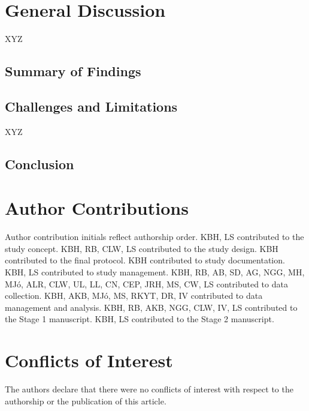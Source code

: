 \documentclass[,man,floatsintext]{apa6}
\begin{document}
\hypertarget{general-discussion}{%
\section{General Discussion}\label{general-discussion}}

XYZ

\hypertarget{summary-of-findings}{%
\subsection{Summary of Findings}\label{summary-of-findings}}

\hypertarget{challenges-and-limitations}{%
\subsection{Challenges and Limitations}\label{challenges-and-limitations}}

XYZ

\hypertarget{conclusion}{%
\subsection{Conclusion}\label{conclusion}}

\hypertarget{author-contributions}{%
\section{Author Contributions}\label{author-contributions}}

Author contribution initials reflect authorship order. KBH, LS contributed to the study concept. KBH, RB, CLW, LS contributed to the study design. KBH contributed to the final protocol. KBH contributed to study documentation. KBH, LS contributed to study management. KBH, RB, AB, SD, AG, NGG, MH, MJó, ALR, CLW, UL, LL, CN, CEP, JRH, MS, CW, LS contributed to data collection. KBH, AKB, MJó, MS, RKYT, DR, IV contributed to data management and analysis. KBH, RB, AKB, NGG, CLW, IV, LS contributed to the Stage 1 manuscript. KBH, LS contributed to the Stage 2 manuscript.

\hypertarget{conflicts-of-interest}{%
\section{Conflicts of Interest}\label{conflicts-of-interest}}

The authors declare that there were no conflicts of interest with respect to the authorship or the publication of this article.
\end{document}
